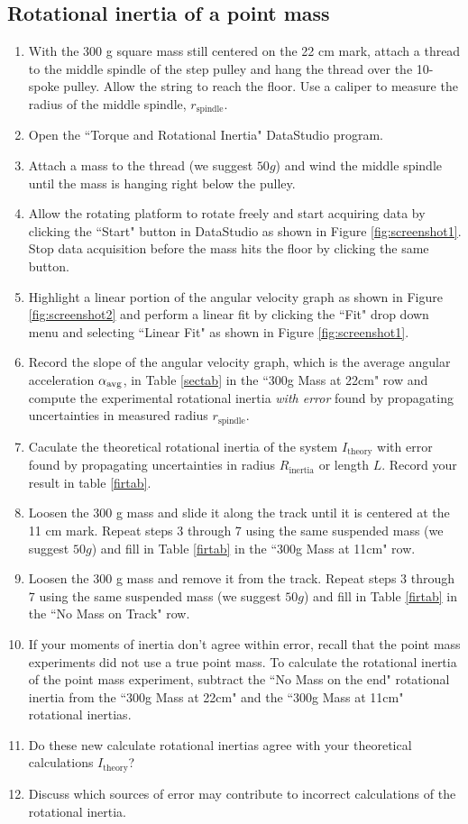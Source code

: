 \subsection{Rotational inertia of a point mass}
\label{pointmass}
\begin{enumerate}
	\item With the 300 g square mass still centered on the 22 cm mark, attach a thread to the middle spindle of the step pulley and hang the thread over the 10-spoke pulley.  Allow the string to reach the floor.  Use a caliper to measure the radius of the middle spindle, $r_\text{spindle}$.
	\item Open the ``Torque and Rotational Inertia" DataStudio program.
	\item Attach a mass to the thread (we suggest $50g$) and wind the middle spindle until the mass is hanging right below the pulley.
	\item Allow the rotating platform to rotate freely and start acquiring data by clicking the ``Start" button in DataStudio as shown in Figure \ref{fig:screenshot1}. Stop data acquisition before the mass hits the floor by clicking the same button.
	\item Highlight a linear portion of the angular velocity graph as shown in Figure \ref{fig:screenshot2} and perform a linear fit by clicking the ``Fit" drop down menu and selecting ``Linear Fit" as shown in Figure \ref{fig:screenshot1}.
	\item Record the slope of the angular velocity graph, which is the average angular acceleration $\alpha _{\rm avg}$, in Table \ref{sectab} in the ``300g Mass at 22cm" row and compute the experimental rotational inertia {\it{with error}} found by propagating uncertainties in measured radius $r_\text{spindle}$.
\item Caculate the theoretical rotational inertia of the system $I_\text{theory}$ with error found by propagating uncertainties in radius $R_\text{inertia}$ or length $L$. Record your result in table \ref{firtab}.
	\item Loosen the 300 g mass and slide it along the track until it is centered at the 11 cm mark.  Repeat steps 3 through 7 using the same suspended mass (we suggest $50g$) and fill in Table \ref{firtab} in the ``300g Mass at 11cm" row.
	\item Loosen the 300 g mass and remove it from the track.  Repeat steps 3 through 7 using the same suspended mass (we suggest $50g$) and fill in Table \ref{firtab} in the ``No Mass on Track" row.
\item If your moments of inertia don't agree within error, recall that the point mass experiments did not use a true point mass. To calculate the rotational inertia of the point mass experiment, subtract the ``No Mass on the end" rotational inertia from the ``300g Mass at 22cm" and the ``300g Mass at 11cm" rotational inertias.
\item Do these new calculate rotational inertias agree with your theoretical calculations $I_\text{theory}$?
\item Discuss which sources of error may contribute to incorrect calculations of the rotational inertia.
\end{enumerate}

